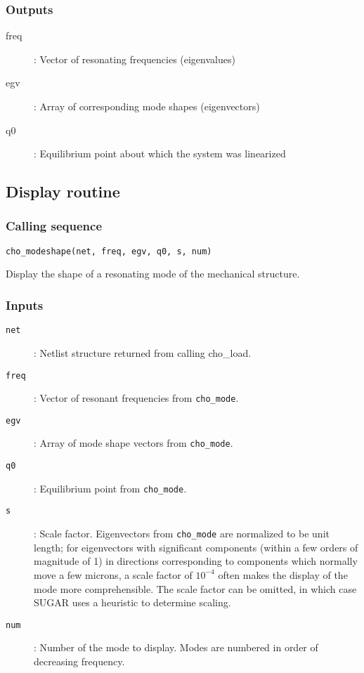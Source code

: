 \subsubsection*{Outputs}

\begin{description}
\item[freq]: Vector of resonating frequencies (eigenvalues)
\item[egv]: Array of corresponding mode shapes (eigenvectors)
\item[q0]: Equilibrium point about which the system was linearized
\end{description}

\subsection*{Display routine}

\subsubsection*{Calling sequence}

\begin{verbatim}
cho_modeshape(net, freq, egv, q0, s, num)
\end{verbatim}

Display the shape of a resonating mode of the mechanical structure.

\subsubsection*{Inputs}

\begin{description}
\item[\texttt{net}]: 
  Netlist structure returned from calling cho\_load.
\item[\texttt{freq}]: Vector of resonant frequencies from \texttt{cho\_mode}.
\item[\texttt{egv}]: Array of mode shape vectors from \texttt{cho\_mode}.
\item[\texttt{q0}]: Equilibrium point from \texttt{cho\_mode}.
\item[\texttt{s}]: Scale factor.  Eigenvectors from \texttt{cho\_mode}
  are normalized to be unit length; for eigenvectors with significant
  components (within a few orders of magnitude of 1) in directions
  corresponding to components which normally move a few microns,
  a scale factor of $10^{-4}$ often makes the display of the mode
  more comprehensible.  The scale factor can be omitted, in which case
  SUGAR uses a heuristic to determine scaling.
\item[\texttt{num}]: Number of the mode to display.  Modes are numbered
  in order of decreasing frequency.
\end{description}

